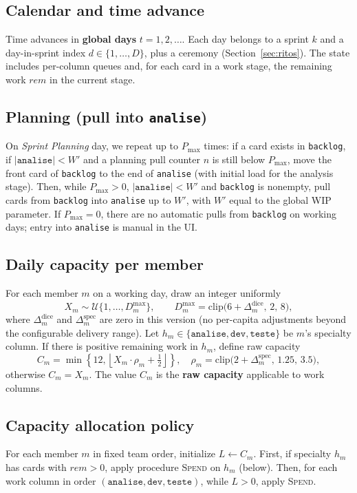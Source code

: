\subsection{Calendar and time advance}
Time advances in \textbf{global days} $t=1,2,\dots$. Each day belongs to a sprint $k$ and a day-in-sprint index $d\in\{1,\dots,D\}$, plus a ceremony (Section~\ref{sec:ritos}). The state includes per-column queues and, for each card in a work stage, the remaining work $\textit{rem}$ in the current stage.

\subsection{Planning (pull into \texttt{analise})}
On \emph{Sprint Planning} day, we repeat up to $P_{\max}$ times: if a card exists in \texttt{backlog}, if $|\texttt{analise}|<W'$ and a planning pull counter $n$ is still below $P_{\max}$, move the front card of \texttt{backlog} to the end of \texttt{analise} (with initial load for the analysis stage). Then, while $P_{\max}>0$, $|\texttt{analise}|<W'$ and \texttt{backlog} is nonempty, pull cards from \texttt{backlog} into \texttt{analise} up to $W'$, with $W'$ equal to the global WIP parameter. If $P_{\max}=0$, there are no automatic pulls from \texttt{backlog} on working days; entry into \texttt{analise} is manual in the UI.

\subsection{Daily capacity per member}
For each member $m$ on a working day, draw an integer uniformly
\[
X_m \sim \mathcal{U}\{1,\dots,D^{\max}_m\},\qquad
D^{\max}_m = \mathrm{clip}\big(6+\Delta^{\text{dice}}_m,\,2,\,8\big),
\]
where $\Delta^{\text{dice}}_m$ and $\Delta^{\text{spec}}_m$ are zero in this version (no per-capita adjustments beyond the configurable delivery range). Let $h_m\in\{\texttt{analise},\texttt{dev},\texttt{teste}\}$ be $m$'s specialty column. If there is positive remaining work in $h_m$, define raw capacity
\[
C_m = \min\left\{12,\left\lfloor X_m \cdot \rho_m + \tfrac{1}{2}\right\rfloor\right\},
\quad
\rho_m = \mathrm{clip}\big(2+\Delta^{\text{spec}}_m,\,1.25,\,3.5\big),
\]
otherwise $C_m=X_m$. The value $C_m$ is the \textbf{raw capacity} applicable to work columns.

\subsection{Capacity allocation policy}
For each member $m$ in fixed team order, initialize $L\leftarrow C_m$. First, if specialty $h_m$ has cards with $\textit{rem}>0$, apply procedure \textsc{Spend} on $h_m$ (below). Then, for each work column in order $(\texttt{analise},\texttt{dev},\texttt{teste})$, while $L>0$, apply \textsc{Spend}.

